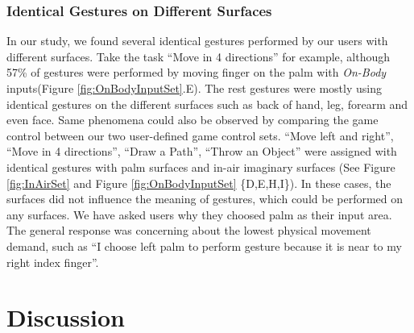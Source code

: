 \documentclass{sigchi}
\begin{document}
\subsubsection{Identical Gestures on Different Surfaces}
 In our study, we found several identical gestures performed by our users with different surfaces. Take the task ``Move in 4 directions'' for example, although 57\% of gestures were performed by moving finger on the palm with \emph{On-Body} inputs(Figure \ref{fig:OnBodyInputSet}.E). The rest gestures were mostly using identical gestures on the different surfaces such as back of hand, leg, forearm and even face. Same phenomena could also be observed by comparing the game control between our two user-defined game control sets. ``Move left and right'', ``Move in 4 directions'', ``Draw a Path'', ``Throw an Object'' were assigned with identical gestures with palm surfaces and in-air imaginary surfaces (See Figure \ref{fig:InAirSet} and Figure \ref{fig:OnBodyInputSet} \{D,E,H,I\}). In these cases, the surfaces did not influence the meaning of gestures, which could be performed on any surfaces. We have asked users why they choosed palm as their input area. The general response was concerning about the lowest physical movement demand, such as ``I choose left palm to perform gesture because it is near to my right index finger''.


 

  \section{Discussion}
\end{document}
